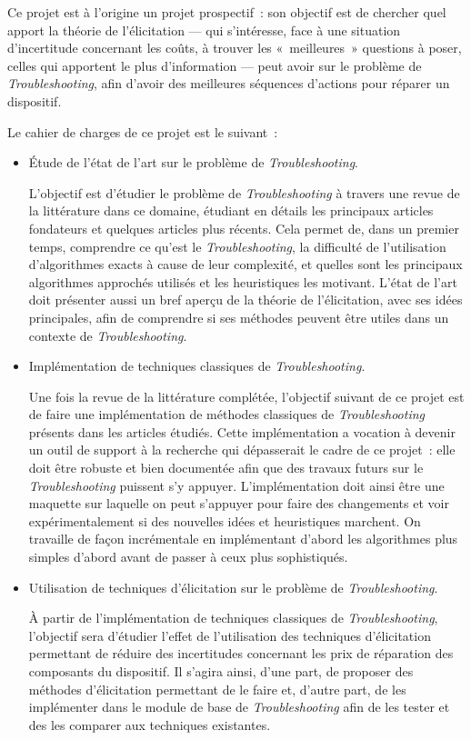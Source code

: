 \documentclass[a4paper,11pt]{article}
\theoremstyle{plain}
\theoremstyle{definition}
\begin{document}
Ce projet est à l'origine un projet prospectif~: son objectif est de chercher quel apport la théorie de l'élicitation --- qui s'intéresse, face à une situation d'incertitude concernant les coûts, à trouver les «~meilleures~» questions à poser, celles qui apportent le plus d'information --- peut avoir sur le problème de \emph{Troubleshooting}, afin d'avoir des meilleures séquences d'actions pour réparer un dispositif.

Le cahier de charges de ce projet est le suivant~:
\begin{itemize}
\item Étude de l'état de l'art sur le problème de \emph{Troubleshooting}.

L'objectif est d'étudier le problème de \emph{Troubleshooting} à travers une revue de la littérature dans ce domaine, étudiant en détails les principaux articles fondateurs et quelques articles plus récents. Cela permet de, dans un premier temps, comprendre ce qu'est le \emph{Troubleshooting}, la difficulté de l'utilisation d'algorithmes exacts à cause de leur complexité, et quelles sont les principaux algorithmes approchés utilisés et les heuristiques les motivant. L'état de l'art doit présenter aussi un bref aperçu de la théorie de l'élicitation, avec ses idées principales, afin de comprendre si ses méthodes peuvent être utiles dans un contexte de \emph{Troubleshooting}.

\item Implémentation de techniques classiques de \emph{Troubleshooting}.

Une fois la revue de la littérature complétée, l'objectif suivant de ce projet est de faire une implémentation de méthodes classiques de \emph{Troubleshooting} présents dans les articles étudiés. Cette implémentation a vocation à devenir un outil de support à la recherche qui dépasserait le cadre de ce projet~: elle doit être robuste et bien documentée afin que des travaux futurs sur le \emph{Troubleshooting} puissent s'y appuyer. L'implémentation doit ainsi être une maquette sur laquelle on peut s'appuyer pour faire des changements et voir expérimentalement si des nouvelles idées et heuristiques marchent. On travaille de façon incrémentale en implémentant d'abord les algorithmes plus simples d'abord avant de passer à ceux plus sophistiqués.

\item Utilisation de techniques d'élicitation sur le problème de \emph{Troubleshooting}.

À partir de l'implémentation de techniques classiques de \emph{Troubleshooting}, l'objectif sera d'étudier l'effet de l'utilisation des techniques d'élicitation permettant de réduire des incertitudes concernant les prix de réparation des composants du dispositif. Il s'agira ainsi, d'une part, de proposer des méthodes d'élicitation permettant de le faire et, d'autre part, de les implémenter dans le module de base de \emph{Troubleshooting} afin de les tester et des les comparer aux techniques existantes.


\end{itemize}
\end{document}

